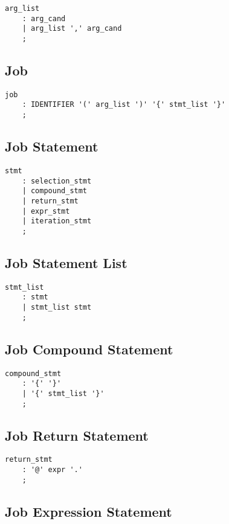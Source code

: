 \documentclass[prodmode,acmtecs]{acmsmall}
\begin{document}
\begin{lstlisting}
arg_list
	: arg_cand
	| arg_list ',' arg_cand
	;
\end{lstlisting}

\subsection{Job}

\begin{lstlisting}
job
	: IDENTIFIER '(' arg_list ')' '{' stmt_list '}'
	;
\end{lstlisting}


\subsection{Job Statement}

\begin{lstlisting}
stmt
	: selection_stmt
	| compound_stmt
	| return_stmt
	| expr_stmt
	| iteration_stmt
	;
\end{lstlisting}


\subsection{Job Statement List}

\begin{lstlisting}
stmt_list
	: stmt
	| stmt_list stmt
	;
\end{lstlisting}


\subsection{Job Compound Statement}

\begin{lstlisting}
compound_stmt
	: '{' '}'
	| '{' stmt_list '}'
	;
\end{lstlisting}


\subsection{Job Return Statement}

\begin{lstlisting}
return_stmt
	: '@' expr '.'
	;

\end{lstlisting}


\subsection{Job Expression Statement}
\end{document}
